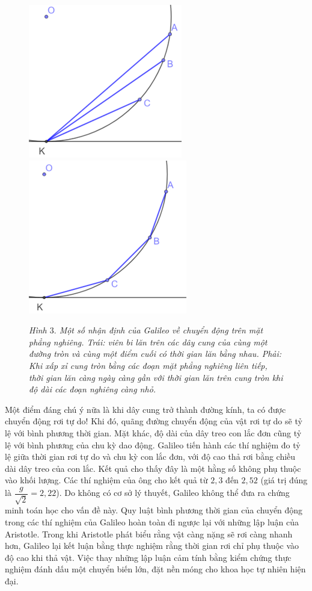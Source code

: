 \begin{multicols}{2}
\begin{figure}[H]
		\includegraphics[height= 0.45\linewidth]{3a}
		\includegraphics[height= 0.45\linewidth]{3b}
		\caption{\small\textit{\color{timhieukhoahoc}Hình $3.$ Một số nhận định của Galileo về chuyển động trên mặt phẳng nghiêng. Trái: viên bi lăn trên các dây cung của cùng một đường tròn và cùng một điểm cuối có thời gian lăn bằng nhau. Phải: Khi xấp xỉ cung tròn bằng các đoạn mặt phẳng nghiêng liên tiếp, thời gian lăn càng ngày càng gần với thời gian lăn trên cung tròn khi độ dài các đoạn nghiêng càng nhỏ.}}
		\vspace*{-10pt}
	\end{figure}
	Một điểm đáng chú ý nữa là khi dây cung trở thành đường kính, ta có được chuyển động rơi tự do! Khi đó, quãng đường chuyển động của vật rơi tự do sẽ tỷ lệ với bình phương thời gian. Mặt khác, độ dài của dây treo con lắc đơn cũng tỷ lệ với bình phương của chu kỳ dao động. Galileo tiến hành các thí nghiệm đo tỷ lệ giữa thời gian rơi tự do và chu kỳ con lắc đơn, với độ cao thả rơi bằng chiều dài dây treo của con lắc. Kết quả cho thấy đây là một hằng số không phụ thuộc vào khối lượng. Các thí nghiệm của ông cho kết quả từ $2{,}3$ đến $2{,}52$ (giá trị đúng là $\dfrac{g}{\sqrt{2}}=2{,}22$). Do không có cơ sở lý thuyết, Galileo không thể đưa ra chứng minh toán học cho vấn đề này.
	\vskip 0.1cm
	Quy luật bình phương thời gian của chuyển động trong các thí nghiệm của Galileo hoàn toàn đi ngược lại với những lập luận của Aristotle. Trong khi Aristotle phát biểu rằng vật càng nặng sẽ rơi càng nhanh hơn, Galileo lại kết luận bằng thực nghiệm rằng thời gian rơi chỉ phụ thuộc vào độ cao khi thả vật. Việc thay những lập luận cảm tính bằng kiểm chứng thực nghiệm đánh dấu một chuyển biến lớn, đặt nền móng cho khoa học tự nhiên hiện đại.

\end{multicols}
